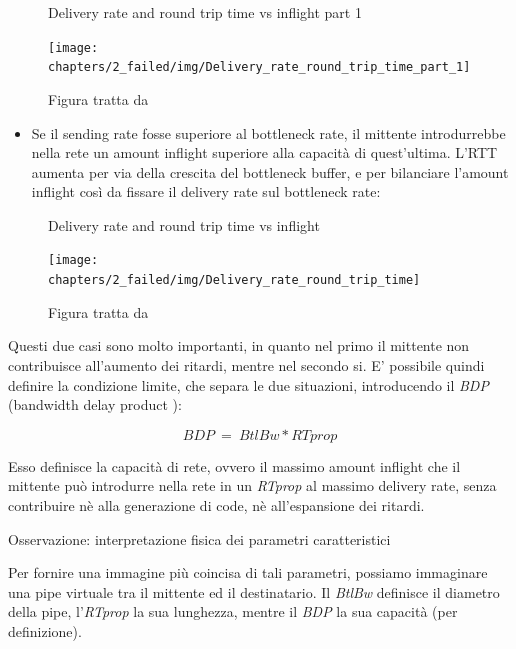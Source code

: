 \begin{figure}[H]

\center
\caption{Delivery rate and round trip time vs inflight part 1}
\label{Delivery_rate_round_trip_time_part_1}
\texttt{[image: chapters/2\_failed/img/Delivery\_rate\_round\_trip\_time\_part\_1]}
\caption*{Figura tratta da \cite[p.~60]{Cardwell:2017:BCC:3042068.3009824}}

\end{figure}

\begin{itemize}

\item Se il sending rate fosse superiore al bottleneck rate, il mittente introdurrebbe nella rete un amount inflight superiore alla capacità di quest'ultima. L'RTT aumenta per via della crescita del bottleneck buffer, e per bilanciare l'amount inflight così da fissare il delivery rate sul bottleneck rate:

\end{itemize}

\begin{figure}[H]

\center
\caption{Delivery rate and round trip time vs inflight}
\label{Delivery_rate_round_trip_time}
\texttt{[image: chapters/2\_failed/img/Delivery\_rate\_round\_trip\_time]}
\caption*{Figura tratta da \cite[p.~60]{Cardwell:2017:BCC:3042068.3009824}}

\end{figure}

Questi due casi sono molto importanti, in quanto nel primo il mittente non contribuisce all'aumento dei ritardi, mentre nel secondo si. E' possibile quindi definire la condizione limite, che separa le due situazioni, introducendo il \textit{BDP} (bandwidth delay product \cite[p.~59]{Cardwell:2017:BCC:3042068.3009824}):

\[ BDP \:=\: BtlBw * RTprop \]

Esso definisce la capacità di rete, ovvero il massimo amount inflight che il mittente può introdurre nella rete in un \textit{RTprop} al massimo delivery rate, senza contribuire nè alla generazione di code, nè all'espansione dei ritardi. \bigskip

\begin{suggerimento}{Osservazione: interpretazione fisica dei parametri caratteristici}

Per fornire una immagine più coincisa di tali parametri, possiamo immaginare una pipe virtuale tra il mittente ed il destinatario. Il \textit{BtlBw} definisce il diametro della pipe, l’\textit{RTprop} la sua lunghezza, mentre il \textit{BDP} la sua capacità (per definizione). \bigskip

\end{suggerimento}

